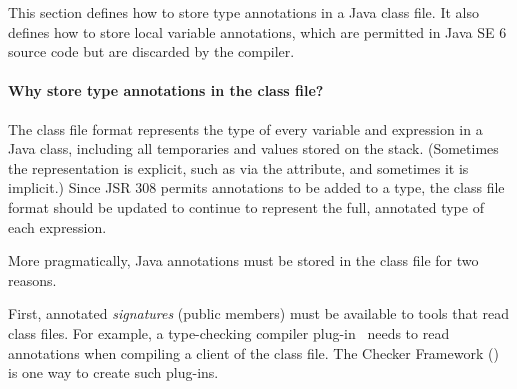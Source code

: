 \documentclass[10pt]{article}
\begin{document}
\newcommand{\RuntimeVisibleAnnotations}{\code{Runtime\-Visible\-Annotations}\xspace}
\newcommand{\RuntimeInvisibleAnnotations}{\code{Runtime\-Invisible\-Annotations}\xspace}
\newcommand{\RuntimeInOrVisibleAnnotations}{\code{Runtime}\-[\code{In}]\code{visible\-Annotations}\xspace}
\newcommand{\RuntimeVisibleParameterAnnotations}{\code{Runtime\-Visible\-Parameter\-Annotations}\xspace}
\newcommand{\RuntimeInvisibleParameterAnnotations}{\code{Runtime\-Invisible\-Parameter\-Annotations}\xspace}
\newcommand{\RuntimeInOrVisibleParameterAnnotations}{\code{Runtime}\-[\code{In}]\code{visible\-Parameter\-Annotations}\xspace}
\newcommand{\RuntimeInOrVisibleAnnotationsOrParameterAnnotations}{\code{Runtime}\-[\code{In}]\code{visible}[\code{Parameter}]\code{Annotations}\xspace}
\newcommand{\RuntimeVisibleTypeAnnotations}{\code{Runtime\-Visible\-Type\-Annotations}\xspace}
\newcommand{\RuntimeInvisibleTypeAnnotations}{\code{Runtime\-Invisible\-Type\-Annotations}\xspace}
\newcommand{\RuntimeInOrVisibleTypeAnnotations}{\code{Runtime}\-[\code{In}]\code{visible\-Type\-Annotations}\xspace}

\newcommand{\extendedannotation}{\code{extend\-ed\-\_anno\-ta\-tion}\xspace}


This section defines how to store type annotations in a Java class file.
It also defines how to store local variable annotations, which are
permitted in Java SE 6 source code but are discarded by the compiler.


\paragraph{Why store type annotations in the class file?}

The class file format represents the type of every variable and expression
in a Java class, including all temporaries and values stored on the stack.
(Sometimes the representation is explicit, such as via the
 attribute, and sometimes it is implicit.)
Since JSR 308 permits annotations to be added to a type, the class file
format should be updated to continue to represent the full, annotated type
of each expression.


More pragmatically, Java annotations must be stored in the class file for two reasons.

First, annotated \emph{signatures} (public members) must be available to
tools that read class files.  For example, a type-checking compiler
plug-in~\cite{JSR269,PapiACPE2008} needs to read annotations when compiling
a client of the class file.  The Checker Framework
() is
one way to create such plug-ins.
\end{document}
